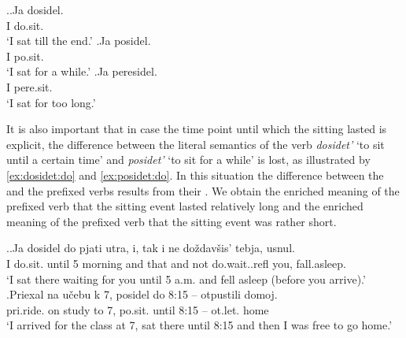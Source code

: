 \ex.\ag.\label{ex:dosidel}Ja dosidel.\\
I do.sit.\\
\trans `I sat till the end.'
\bg.\label{ex:posidel}Ja posidel.\\
I po.sit.\\
\trans `I sat for a while.'
\bg.\label{ex:peresidel}Ja peresidel.\\
I pere.sit.\\
\trans `I sat for too long.'

It is also important that in case the time point until which the sitting lasted is explicit, the difference between the literal semantics of the verb \textit{dosidet'} `to sit until a certain time' and \textit{posidet'} `to sit for a while' is lost, as illustrated by \ref{ex:dosidet:do} and \ref{ex:posidet:do}. In this situation the difference between the  and the prefixed verbs results from their . We obtain the enriched meaning of the prefixed verb that the sitting event lasted relatively long and the enriched meaning of the prefixed verb that the sitting event was rather short.\largerpage

\ex.\ag.\label{ex:dosidet:do}Ja dosidel do pjati utra, i, tak i ne do\v{z}dav\v{s}is' tebja, usnul.\\
I do.sit. until 5 morning and that and not do.wait..refl you, fall.asleep.\\
\trans `I sat there waiting for you until 5 a.m. and fell asleep (before you arrive).'
\bg.\label{ex:posidet:do}Priexal na u\v{c}ebu k 7, posidel do 8:15 -- otpustili domoj.\\
pri.ride. on study to 7, po.sit. until 8:15 -- ot.let. home\\
\trans `I arrived for the class at 7, sat there until 8:15 and then I was free to go home.'

